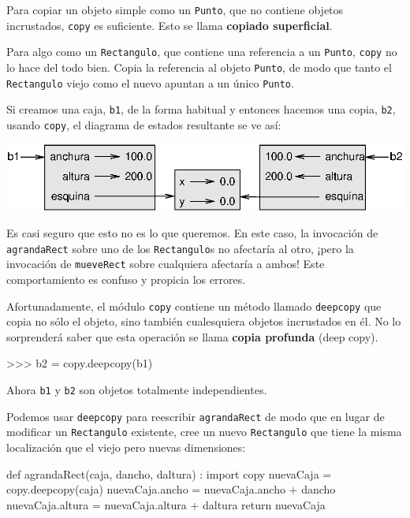 Para copiar un objeto simple como un \texttt{Punto}, que no contiene
objetos incrustados, \texttt{copy} es suficiente. Esto se llama \textbf{copiado
superficial}.

Para algo como un \texttt{Rectangulo}, que contiene una referencia
a un \texttt{Punto}, \texttt{copy} no lo hace del todo bien. Copia
la referencia al objeto \texttt{Punto}, de modo que tanto el \texttt{Rectangulo}
viejo como el nuevo apuntan a un único \texttt{Punto}.

Si creamos una caja, \texttt{b1}, de la forma habitual y entonces
hacemos una copia, \texttt{b2}, usando \texttt{copy}, el diagrama
de estados resultante se ve así:

\beforefig \centerline{\includegraphics{illustrations/rectangle2}}
\afterfig

Es casi seguro que esto no es lo que queremos. En este caso, la invocación
de \texttt{agrandaRect} sobre uno de los \texttt{Rectangulo}s no afectaría
al otro, ¡pero la invocación de \texttt{mueveRect} sobre cualquiera
afectaría a ambos! Este comportamiento es confuso y propicia los errores.

Afortunadamente, el módulo \texttt{copy} contiene un método llamado
\texttt{deepcopy} que copia no sólo el objeto, sino también cualesquiera
objetos incrustados en él. No lo sorprenderá saber que esta operación
se llama \textbf{copia profunda} (deep copy).

\begin{pyconcode}
>>> b2 = copy.deepcopy(b1)
\end{pyconcode}
 Ahora \texttt{b1} y \texttt{b2} son objetos totalmente independientes.

Podemos usar \texttt{deepcopy} para reescribir \texttt{agrandaRect}
de modo que en lugar de modificar un \texttt{Rectangulo} existente,
cree un nuevo \texttt{Rectangulo} que tiene la misma localización
que el viejo pero nuevas dimensiones:

\begin{pythoncode}
def agrandaRect(caja, dancho, daltura) :
  import copy
  nuevaCaja = copy.deepcopy(caja)
  nuevaCaja.ancho = nuevaCaja.ancho + dancho
  nuevaCaja.altura = nuevaCaja.altura + daltura
  return nuevaCaja
\end{pythoncode}
 

